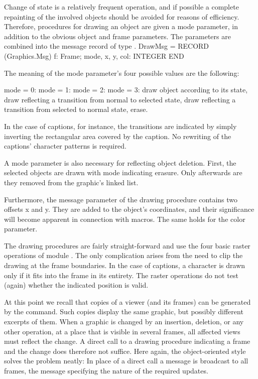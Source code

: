 Change of state is a relatively frequent operation, and if possible a complete repainting of the involved objects should be avoided for reasons of efficiency. Therefore, procedures for drawing an object are given a mode parameter, in addition to the obvious object and frame parameters. The parameters are combined into the message record of type .
\begintt
DrawMsg = RECORD (Graphics.Msg) f: Frame;
mode, x, y, col: INTEGER END
\endtt

The meaning of the mode parameter's four possible values are the following:

mode = 0: mode = 1: mode = 2: mode = 3:
draw object according to its state,
draw reflecting a transition from normal to selected state,
draw reflecting a transition from selected to normal state, erase.

In the case of captions, for instance, the transitions are indicated by simply inverting the rectangular area covered by the caption. No rewriting of the captions' character patterns is required.

A mode parameter is also necessary for reflecting object deletion. First, the selected objects are drawn with mode indicating erasure. Only afterwards are they removed from the graphic's linked list.

Furthermore, the message parameter of the drawing procedure contains two offsets x and y. They are added to the object's coordinates, and their significance will become apparent in connection with macros. The same holds for the color parameter.

The drawing procedures are fairly straight-forward and use the four basic raster operations of module . The only complication arises from the need to clip the drawing at the frame boundaries. In the case of captions, a character is drawn only if it fits into the frame in its entirety. The raster operations do not test (again) whether the indicated position is valid.

At this point we recall that copies of a viewer (and its frames) can be generated by the  command. Such copies display the same graphic, but possibly different excerpts of them. When a graphic is changed by an insertion, deletion, or any other operation, at a place that is visible in several frames, all affected views must reflect the change. A direct call to a drawing procedure indicating a frame and the change does therefore not suffice. Here again, the object-oriented style solves the problem neatly: In place of a direct call a message is broadcast to all frames, the message specifying the nature of the required updates.

